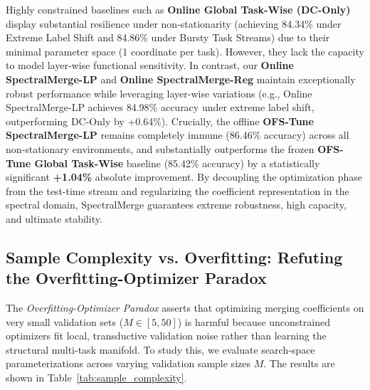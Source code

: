 Highly constrained baselines such as \textbf{Online Global Task-Wise (DC-Only)} display substantial resilience under non-stationarity (achieving 84.34\% under Extreme Label Shift and 84.86\% under Bursty Task Streams) due to their minimal parameter space (1 coordinate per task). However, they lack the capacity to model layer-wise functional sensitivity. In contrast, our \textbf{Online SpectralMerge-LP} and \textbf{Online SpectralMerge-Reg} maintain exceptionally robust performance while leveraging layer-wise variations (e.g., Online SpectralMerge-LP achieves 84.98\% accuracy under extreme label shift, outperforming DC-Only by +0.64\%). Crucially, the offline \textbf{OFS-Tune SpectralMerge-LP} remains completely immune (86.46\% accuracy) across all non-stationary environments, and substantially outperforms the frozen \textbf{OFS-Tune Global Task-Wise} baseline (85.42\% accuracy) by a statistically significant \textbf{+1.04\%} absolute improvement. By decoupling the optimization phase from the test-time stream and regularizing the coefficient representation in the spectral domain, SpectralMerge guarantees extreme robustness, high capacity, and ultimate stability.

\subsection{Sample Complexity vs. Overfitting: Refuting the Overfitting-Optimizer Paradox}
The \emph{Overfitting-Optimizer Paradox} asserts that optimizing merging coefficients on very small validation sets ($M \in [5, 50]$) is harmful because unconstrained optimizers fit local, transductive validation noise rather than learning the structural multi-task manifold. To study this, we evaluate search-space parameterizations across varying validation sample sizes $M$. The results are shown in Table~\ref{tab:sample_complexity}.

